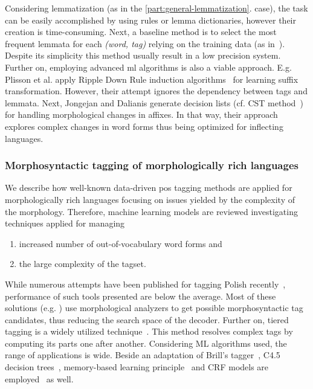 Considering lemmatization (as in the \ref{part:general-lemmatization}. case), the task can be easily accomplished by using rules or lemma dictionaries, however their creation is time-consuming.
Next, a baseline method is to select the most frequent lemmata for each \emph{(word, tag)} relying on the training data (as in~\cite{zsibrata2013magyarlanc}). 
Despite its simplicity this method usually result in a low precision system.
Further on, employing advanced \gls{ml} algorithms is also a viable approach.
E.g. Plisson et al. apply Ripple Down Rule induction algorithms~\cite{Plisson2004} for learning suffix transformation.
However, their attempt ignores the dependency between tags and lemmata.
Next, Jongejan and Dalianis generate decision lists (cf. CST method~\cite{Jongejan}) for handling morphological changes in affixes.
In that way, their approach explores complex changes in word forms thus being optimized for inflecting languages.  

\subsubsection{Morphosyntactic tagging of morphologically rich languages}

We describe how well-known data-driven \gls{pos} tagging methods are applied for morphologically rich languages focusing on issues yielded by the complexity of the morphology.
Therefore, machine learning models are reviewed investigating techniques applied for managing
\begin{enumerate}
  \item increased number of out-of-vocabulary word forms and
  \item the large complexity of the tagset. 
\end{enumerate}

While numerous attempts have been published for tagging Polish recently~\cite{Piasecki2006,Piasecki2007,Acedanski2010,Radziszewski2013},  performance of such tools presented are below the average.
Most of these solutions (e.g. \cite{Radziszewski2013}) use morphological analyzers to get possible morphosyntactic tag candidates, thus reducing the search space of the decoder.
Further on, tiered tagging is a widely utilized technique~\cite{Radziszewski2013}.
This method resolves complex tags by computing its parts one after another.
Considering ML algorithms used, the range of applications is wide.
Beside an adaptation of Brill’s tagger~\cite{Acedanski2010}, C4.5 decision trees~\cite{Piasecki2007}, memory-based learning principle~\cite{Radziszewski2011} and CRF models are employed~\cite{Radziszewski2013} as well. 

